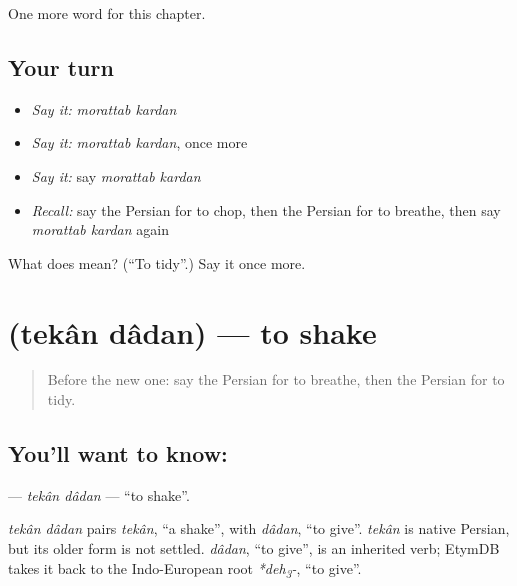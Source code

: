 \begin{grammarlens}[title={What you've built}]
One more word for this chapter.
\end{grammarlens}

\subsection*{Your turn}
\begin{itemize}
\raggedright
  \item \emph{Say it:} \emph{morattab kardan}
  \item \emph{Say it:} \emph{morattab kardan}, once more
  \item \emph{Say it:} say \emph{morattab kardan}
  \item \emph{Recall:} say the Persian for to chop, then the Persian for to breathe, then say \emph{morattab kardan} again
\end{itemize}

\begin{tcolorbox}[breakable,colback=teal!4,colframe=teal!35!black,title={Before you move on}]
What does   mean? (\textquotedblleft{}To tidy\textquotedblright{}.) Say it once more.
\end{tcolorbox}
\section[\texorpdfstring{\fa{تکان} \fa{دادن} (tekân dâdan)}{تکان دادن (tekân dâdan)}]{  (tekân dâdan) — to shake}

\label{lesson:FA-C181-tekan-dadan}



\begin{quote}
Before the new one: say the Persian for to breathe, then the Persian for to tidy.
\end{quote}

\subsection*{You'll want to know:  }
\textbf{ } — \emph{tekân dâdan} — \textquotedblleft{}to shake\textquotedblright{}.

\begin{cousinweb}
\emph{tekân dâdan} pairs \emph{tekân}, \textquotedblleft{}a shake\textquotedblright{}, with \emph{dâdan}, \textquotedblleft{}to give\textquotedblright{}. \emph{tekân} is native Persian, but its older form is not settled. \emph{dâdan}, \textquotedblleft{}to give\textquotedblright{}, is an inherited verb; EtymDB takes it back to the Indo-European root \emph{*deh\textsubscript{3}-}, \textquotedblleft{}to give\textquotedblright{}.
\end{cousinweb}

